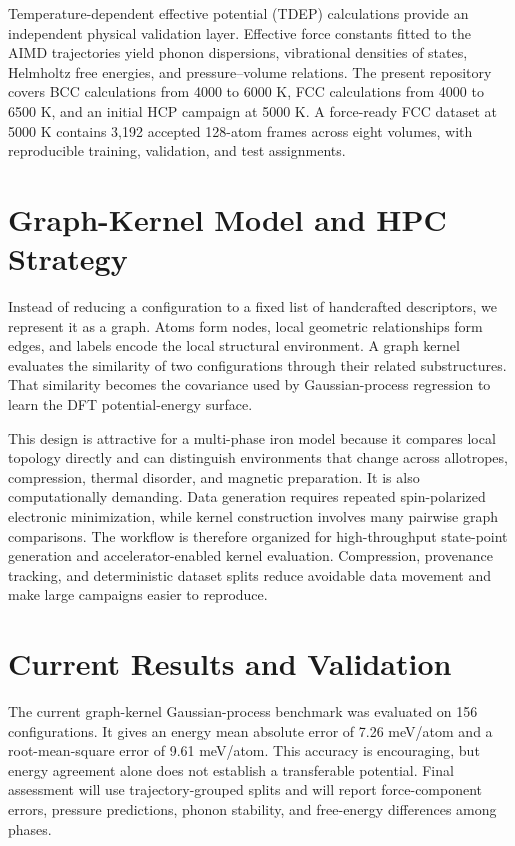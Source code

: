 \documentclass[conference]{IEEEtran}
\begin{document}
Temperature-dependent effective potential (TDEP) calculations provide an independent physical validation layer. Effective force constants fitted to the AIMD trajectories yield phonon dispersions, vibrational densities of states, Helmholtz free energies, and pressure--volume relations. The present repository covers BCC calculations from 4000 to 6000 K, FCC calculations from 4000 to 6500 K, and an initial HCP campaign at 5000 K. A force-ready FCC dataset at 5000 K contains 3,192 accepted 128-atom frames across eight volumes, with reproducible training, validation, and test assignments.

\section{Graph-Kernel Model and HPC Strategy}
Instead of reducing a configuration to a fixed list of handcrafted descriptors, we represent it as a graph. Atoms form nodes, local geometric relationships form edges, and labels encode the local structural environment. A graph kernel evaluates the similarity of two configurations through their related substructures. That similarity becomes the covariance used by Gaussian-process regression to learn the DFT potential-energy surface.

This design is attractive for a multi-phase iron model because it compares local topology directly and can distinguish environments that change across allotropes, compression, thermal disorder, and magnetic preparation. It is also computationally demanding. Data generation requires repeated spin-polarized electronic minimization, while kernel construction involves many pairwise graph comparisons. The workflow is therefore organized for high-throughput state-point generation and accelerator-enabled kernel evaluation. Compression, provenance tracking, and deterministic dataset splits reduce avoidable data movement and make large campaigns easier to reproduce.

\section{Current Results and Validation}
The current graph-kernel Gaussian-process benchmark was evaluated on 156 configurations. It gives an energy mean absolute error of 7.26 meV/atom and a root-mean-square error of 9.61 meV/atom. This accuracy is encouraging, but energy agreement alone does not establish a transferable potential. Final assessment will use trajectory-grouped splits and will report force-component errors, pressure predictions, phonon stability, and free-energy differences among phases.
\end{document}
